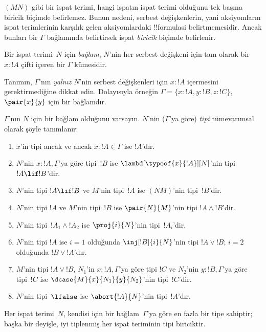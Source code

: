 \documentclass[../../../include/open-logic-section]{subfiles}
\begin{document}


$(MN)$ gibi bir ispat terimi, hangi ispatın ispat terimi olduğunu tek
başına biricik biçimde belirlemez. Bunun nedeni, serbest değişkenlerin, yani
aksiyomların ispat terimlerinin karşılık gelen aksiyomlardaki !!{formula}s{}i
belirtmemesidir. Ancak bunları bir $\Gamma$ bağlamında belirtirsek ispat
\emph{biricik} biçimde belirlenir.

\begin{defn}
Bir ispat terimi~$N$ için \emph{bağlam}, $N$'nin her serbest değişkeni için
tam olarak bir $x : !A$ çifti içeren bir $\Gamma$ kümesidir.
\end{defn}

Tanımın, $\Gamma$'nın \emph{yalnız} $N$'nin serbest değişkenleri için
$x:!A$ içermesini gerektirmediğine dikkat edin. Dolayısıyla örneğin
$\Gamma = \{x:!A, y:!B, z:!C\}$, $\pair{x}{y}$ için bir bağlamdır.

\begin{defn}
  $\Gamma$'nın $N$ için bir bağlam olduğunu varsayın. $N$'nin
  ($\Gamma$'ya göre) \emph{tipi} tümevarımsal olarak şöyle tanımlanır:
  \begin{enumerate}
  \item $x$'in tipi ancak ve ancak $x:!A \in \Gamma$ ise $!A$'dır.
  \item $N$'nin $x:!A, \Gamma$'ya göre tipi~$!B$ ise
  $\lambd[\typeof{x}{!A}][N]$'nin tipi $!A \lif !B$'dir.
  \item $N$'nin tipi $!A \lif !B$ ve $M$'nin tipi~$!A$ ise $(NM)$'nin
  tipi~$!B$'dir.
  \item $N$'nin tipi $!A$ ve $M$'nin tipi~$!B$ ise $\pair{N}{M}$'nin
  tipi $!A \land !B$'dir.
  \item $N$'nin tipi~$!A_1 \land !A_2$ ise $\proj{i}{N}$'nin tipi~$!A_i$'dir.
  \item $N$'nin tipi $!A$ ise $i=1$ olduğunda $\inj[!B]{i}{N}$'nin tipi
  $!A \lor !B$; $i=2$ olduğunda $!B \lor !A$'dır.
  \item $M$'nin tipi $!A \lor !B$, $N_1$'in $x:!A, \Gamma$'ya göre tipi
  $!C$ ve $N_2$'nin $y:!B, \Gamma$'ya göre tipi~$!C$ ise
  $\dcase{M}{x}{N_1}{y}{N_2}$'nin tipi~$!C$'dir.
  \item $N$'nin tipi~$\lfalse$ ise $\abort{!A}{N}$'nin tipi~$!A$'dır.
  \end{enumerate}
\end{defn}

\begin{prop}
Her ispat terimi~$N$, kendisi için bir bağlam~$\Gamma$'ya göre en fazla
bir tipe sahiptir; başka bir deyişle, iyi tiplenmiş her ispat teriminin tipi
biriciktir.
\end{prop}
\end{document}
